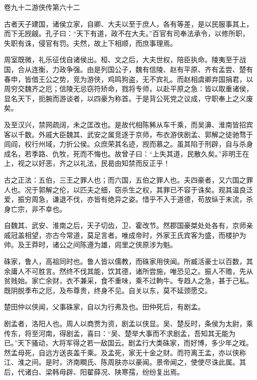 \documentclass[12pt,UTF8]{ctexbook}
\begin{document}
卷九十二游侠传第六十二



古者天子建国，诸侯立家，自卿、大夫以至于庶人，各有等差，是以民服事其上，而下无觊觎。孔子曰：“天下有道，政不在大夫。”百官有司奉法承令，以修所职，失职有诛，侵官有罚。夫然，故上下相顺，而庶事理焉。



周室既微，礼乐征伐自诸侯出。桓、文之后，大夫世权，陪臣执命。陵夷至于战国，合从连衡，力政争强。由是列国公子，魏有信陵、赵有平原、齐有孟尝、楚有春申，皆借王公之势，竞为游侠，鸡鸣狗盗，无不宾礼。而赵相虞卿弃国捐君，以周穷交魏齐之厄；信陵无忌窃符矫命，戮将专师，以赴平原之急：皆以取重诸侯，显名天下，扼腕而游谈者，以四豪为称首。于是背公死党之议成，守职奉上之义废矣。



及至汉兴，禁网疏阔，未之匡改也。是故代相陈豨从车千乘，而吴濞、淮南皆招宾客以千数。外戚大臣魏其、武安之属竞逐于京师，布衣游侠剧孟、郭解之徒驰骛于闾阎，权行州域，力折公侯。众庶荣其名迹，觊而慕之。虽其陷于刑辟，自与杀身成名，若季路、仇牧，死而不悔也。故曾子曰：“上失其道，民散久矣。”非明王在上，视之以好恶，齐之以礼法，民曷由知禁而反正乎！



古之正法：五伯，三王之罪人也；而六国，五伯之罪人也。夫四豪者，又六国之罪人也。况于郭解之伦，以匹夫之细，窃杀生之权，其罪已不容于诛矣。观其温良泛爱，振穷周急，谦退不伐，亦皆有绝异之姿。惜乎不入于道德，苟放纵于末流，杀身亡宗，非不幸也。



自魏其、武安、淮南之后，天子切齿，卫、霍改节。然郡国豪桀处处各有，京师亲戚冠盖相望，亦古今常道，莫足言者。唯成帝时，外家王氏宾客为盛，而楼护为帅。及王莽时，诸公之间陈遵为雄，闾里之侠原涉为魁。



硃家，鲁人，高祖同时也。鲁人皆以儒教，而硃家用侠闻。所臧活豪士以百数，其余庸人不可胜言。然终不伐其能，饮其德，诸所尝施，唯恐见之。振人不赡，先从贫贱始。家亡余财，衣不兼采，食不重味，乘不过軥牛。专趋人之急，甚于己私。既阴脱季布之厄，及布尊贵，终身不见。自关以东，莫不延颈愿交。



楚田仲以侠闻，父事硃家，自以为行弗及也。田仲死后，有剧孟。



剧孟者，洛阳人也。周人以商贾为资，剧孟以侠显。吴、楚反时，条侯为太尉，乘传东，将至河南，得剧孟，喜曰：“吴、楚举大事而不求剧孟，吾知其无能为已。”天下骚动，大将军得之若一敌国云。剧孟行大类硃家，而好博，多少年之戏。然孟母死，自远方送丧盖千乘。及孟死，家无十金之财。而符离王孟，亦以侠称江、淮之间。是时，济南瞷氏、陈周肤亦以豪闻。景帝闻之，使使尽诛此属。其后，代诸白、梁韩毋辟、阳翟薛况、陕寒孺，纷纷复出焉。
\end{document}
